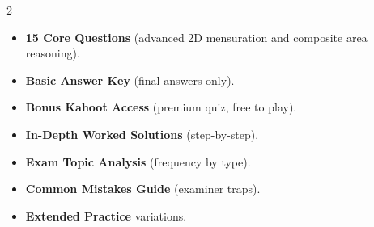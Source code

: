 \documentclass[11pt,a4paper]{article}
\newcommand{\FullReleaseDate}{April 30, 2026}
\begin{document}
\vspace{8pt}

\begin{multicols}{2}
  \begin{tcolorbox}[card, title=\sffamily\bfseries\textcolor{white}{\faHandPointDown\ TODAY (Simplified Version)}, colbacktitle=mainblue, boxed title style={sharp corners, boxrule=0pt}]
    \begin{itemize}[leftmargin=1.2em, itemsep=2pt]
      \item \small \textbf{15 Core Questions} (advanced 2D mensuration and composite area reasoning).
      \item \small \textbf{Basic Answer Key} (final answers only).
      \item \small \textbf{Bonus Kahoot Access} (premium quiz, free to play).
    \end{itemize}
  \end{tcolorbox}

  \columnbreak

  \begin{tcolorbox}[card, title=\sffamily\bfseries\textcolor{white}{\faRocket\ ON \FullReleaseDate\ (Full Upgrade)}, colbacktitle=mainblue, boxed title style={sharp corners, boxrule=0pt}]
    \begin{itemize}[leftmargin=1.2em, itemsep=2pt]
      \item \small \textbf{In-Depth Worked Solutions} (step-by-step).
      \item \small \textbf{Exam Topic Analysis} (frequency by type).
      \item \small \textbf{Common Mistakes Guide} (examiner traps).
      \item \small \textbf{Extended Practice} variations.
    \end{itemize}
  \end{tcolorbox}
\end{multicols}
\end{document}
